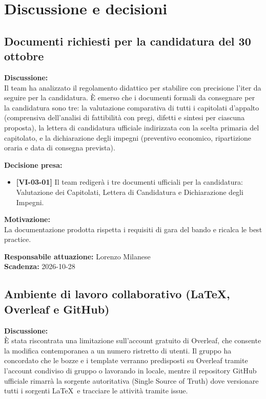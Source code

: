 \documentclass[12pt,a4paper]{article}
\newcommand{\tightlist}{\setlength{\itemsep}{1pt}\setlength{\parskip}{0pt}}
\begin{document}
\newpage
\hypertarget{discussione-e-decisioni}{%
\section{Discussione e decisioni}}

\hypertarget{argomento-1}{%
\subsection{Documenti richiesti per la candidatura del 30 ottobre}}

\textbf{Discussione:} \\
Il team ha analizzato il regolamento didattico per stabilire con precisione l'iter da seguire per la candidatura. È emerso che i documenti formali da consegnare per la candidatura sono tre: la valutazione comparativa di tutti i capitolati d'appalto (comprensiva dell'analisi di fattibilità con pregi, difetti e sintesi per ciascuna proposta), la lettera di candidatura ufficiale indirizzata con la scelta primaria del capitolato, e la dichiarazione degli impegni (preventivo economico, ripartizione oraria e data di consegna prevista).

\textbf{Decisione presa:}
\begin{itemize}
\tightlist
\item[$\checkmark$] \textbf{[VI-03-01]} Il team redigerà i tre documenti ufficiali per la candidatura: Valutazione dei Capitolati, Lettera di Candidatura e Dichiarazione degli Impegni.
\end{itemize}

\textbf{Motivazione:} \\
La documentazione prodotta rispetta i requisiti di gara del bando e ricalca le best practice.

\textbf{Responsabile attuazione:} Lorenzo Milanese \\
\textbf{Scadenza:} 2026-10-28

\hypertarget{argomento-2}{%
\subsection{Ambiente di lavoro collaborativo (\LaTeX, Overleaf e GitHub)}}

\textbf{Discussione:} \\
È stata riscontrata una limitazione sull'account gratuito di Overleaf, che consente la modifica contemporanea a un numero ristretto di utenti. Il gruppo ha concordato che le bozze e i template verranno predisposti su Overleaf tramite l'account condiviso di gruppo o lavorando in locale, mentre il repository GitHub ufficiale rimarrà la sorgente autoritativa (Single Source of Truth) dove versionare tutti i sorgenti \LaTeX\ e tracciare le attività tramite issue.
\end{document}
